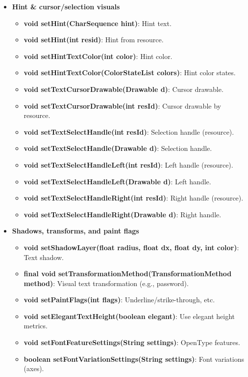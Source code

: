 \documentclass{report}
\begin{document}
\begin{itemize}
\begin{itemize}
        \item \textbf{Hint \& cursor/selection visuals}
            \begin{itemize}
                \item \textbf{void setHint(CharSequence hint)}: Hint text.
                \item \textbf{void setHint(int resid)}: Hint from resource.
                \item \textbf{void setHintTextColor(int color)}: Hint color.
                \item \textbf{void setHintTextColor(ColorStateList colors)}: Hint color states.
                \item \textbf{void setTextCursorDrawable(Drawable d)}: Cursor drawable.
                \item \textbf{void setTextCursorDrawable(int resId)}: Cursor drawable by resource.
                \item \textbf{void setTextSelectHandle(int resId)}: Selection handle (resource).
                \item \textbf{void setTextSelectHandle(Drawable d)}: Selection handle.
                \item \textbf{void setTextSelectHandleLeft(int resId)}: Left handle (resource).
                \item \textbf{void setTextSelectHandleLeft(Drawable d)}: Left handle.
                \item \textbf{void setTextSelectHandleRight(int resId)}: Right handle (resource).
                \item \textbf{void setTextSelectHandleRight(Drawable d)}: Right handle.
            \end{itemize}

        \item \textbf{Shadows, transforms, and paint flags}
            \begin{itemize}
                \item \textbf{void setShadowLayer(float radius, float dx, float dy, int color)}: Text shadow.
                \item \textbf{final void setTransformationMethod(TransformationMethod method)}: Visual text transformation (e.g., password).
                \item \textbf{void setPaintFlags(int flags)}: Underline/strike-through, etc.
                \item \textbf{void setElegantTextHeight(boolean elegant)}: Use elegant height metrics.
                \item \textbf{void setFontFeatureSettings(String settings)}: OpenType features.
                \item \textbf{boolean setFontVariationSettings(String settings)}: Font variations (axes).
            \end{itemize}


\end{itemize}
\end{itemize}
\end{document}
